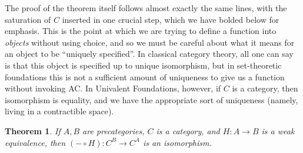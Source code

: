 \documentclass{amsart}
\newtheorem{thm}{Theorem}[section]
\theoremstyle{definition}
\theoremstyle{remark}
\numberwithin{equation}{section}
\begin{document}
The proof of the theorem itself follows almost exactly the same lines, with the saturation of $C$ inserted in one crucial step, which we have bolded below for emphasis.
This is the point at which we are trying to define a function into \emph{objects} without using choice, and so we must be careful about what it means for an object to be ``uniquely specified''.
In classical category theory, all one can say is that this object is specified up to unique isomorphism, but in set-theoretic foundations this is not a sufficient amount of uniqueness to give us a function without invoking AC.
In Univalent Foundations, however, if $C$ is a category, then isomorphism is equality, and we have the appropriate sort of uniqueness (namely, living in a contractible space).

\begin{thm}\label{ct:cat-weq-eq}
  If $A,B$ are precategories, $C$ is a category, and $H:A\to B$ is a weak equivalence, then $(-\circ H):C^B \to C^A$ is an isomorphism.
\end{thm}
\end{document}
